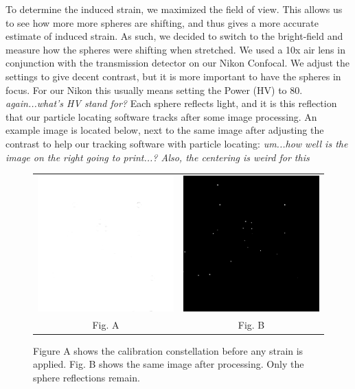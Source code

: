 To determine the induced strain, we maximized the field of view. This allows us to see how more more spheres are shifting, and thus gives a more accurate estimate of induced strain. As such, we decided to switch to the bright-field and measure how the spheres were shifting when stretched. We used a 10x air lens in conjunction with the transmission detector on our Nikon Confocal. We adjust the settings to give decent contrast, but it is more important to have the spheres in focus. For our Nikon this usually means setting the Power (HV) to 80. \emph{again...what's HV stand for?} Each sphere reflects light, and it is this reflection that our particle locating software tracks after some image processing. An example image is located below, next to the same image after adjusting the contrast to help our tracking software with particle locating: \emph{um...how well is the image on the right going to print...? Also, the centering is weird for this}

\begin{figure}[h]
	\label{fig:TDpreandpost}
	\begin{tabular}{cc}
		\includegraphics[width= .48\linewidth]{Chapters/Figures/1xzoom_constellation_zeroStrain.png} & \includegraphics[width= .48\linewidth]{Chapters/Figures/1xzoom_constellation_zeroStrain_supercontrast.png}\\
		Fig. A & Fig. B
	\end{tabular}
	\caption[Bright-field pre and post image processing]{Figure A shows the calibration constellation before any strain is applied. Fig. B shows the same image after processing. Only the sphere reflections remain.}
\end{figure}

